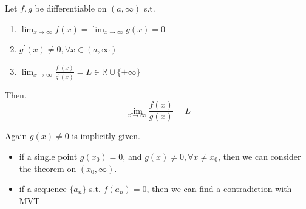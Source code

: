 \begin{theorem}
    \label{thm:lhopital-2}
    Let $f, g$ be differentiable on $(a, \infty)$ s.t. 
    \begin{enumerate}
        \item $\lim_{x \to \infty}f(x) = \lim_{x \to \infty} g(x) = 0$
        \item $g^{\prime}(x) \neq 0, \forall x \in (a, \infty)$
        \item $\lim_{x \to \infty} \frac{f^{\prime}(x)}{g^{\prime}(x)} = L \in \mathbb{R} \cup \{ \pm \infty \} $
    \end{enumerate} 
    Then,
    \[
        \lim_{x \to \infty} \frac{f(x)}{g(x)} = L
    \]
\end{theorem}

\begin{remark}
    Again $g(x) \neq 0$ is implicitly given. 
    \begin{itemize}
        \item if a single point $g(x_0) = 0$,
        and $g(x) \neq 0, \forall x \neq x_0$,
        then we can consider the theorem on
        $(x_0, \infty)$.
        \item if a sequence $\{ a_n \} $ s.t. 
        $f(a_n) = 0$, then we can find a contradiction
        with MVT 
    \end{itemize} 
\end{remark}

\begin{example}
\end{example}

